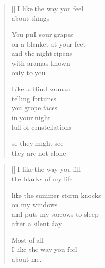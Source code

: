 \documentclass[14pt]{extbook}
\newcommand*{\centeredornament}{\centerline{\pgfornament[width=6cm]{88}}}
\begin{document}

\newpage

\vspace*{-15mm}
\centeredornament
\vspace*{-7mm}


\settowidth{\versewidth}{on a blanket at your feet}

\begin{verse}[\versewidth]
  I like the way you feel \\
  about things

  You pull sour grapes \\
  on a blanket at your feet \\
  and the night ripens \\
  with aromas known \\
  only to you

  Like a blind woman \\
  telling fortunes \\
  you grope faces \\
  in your night \\
  full of constellations

  so they might see \\
  they are not alone
\end{verse}

\newpage

\settowidth{\versewidth}{like the summer storm knocks}

\begin{verse}[\versewidth]
  I like the way you fill \\
  the blanks of my life

  like the summer storm knocks \\
  on my windows \\
  and puts my sorrows to sleep \\
  after a silent day

  Most of all \\
  I like the way you feel \\
  about me.
\end{verse}


\newpage

\vspace*{-15mm}
\centeredornament
\vspace*{-7mm}
\end{document}
